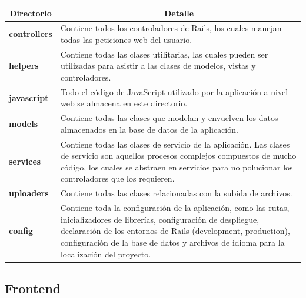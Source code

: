 \begin{center}
  \begin{tabular}{ | l | p{12.5cm} |}
    \hline
    \multicolumn{1}{|c|}{\textbf{Directorio}} & \multicolumn{1}{|c|}{\textbf{Detalle}} \\
    \hline
    
    {\textbf{controllers}} & Contiene todos los controladores de Rails, los cuales manejan todas las peticiones web del usuario. \\ \hline
    
    {\textbf{helpers}} & Contiene todas las clases utilitarias, las cuales pueden ser utilizadas para asistir a las clases de modelos, vistas y controladores. \\ \hline
    
    {\textbf{javascript}} & Todo el código de JavaScript utilizado por la aplicación a nivel web se almacena en este directorio.\\ \hline
    
    {\textbf{models}} & Contiene todas las clases que modelan y envuelven los datos almacenados en la base de datos de la aplicación. \\ \hline
    
    {\textbf{services}} & Contiene todas las clases de servicio de la aplicación. Las clases de servicio son aquellos procesos complejos compuestos de mucho código, los cuales se abstraen en servicios para no polucionar los controladores que los requieren. \\ \hline
    
    {\textbf{uploaders}} & Contiene todas las clases relacionadas con la subida de archivos. \\ \hline
    
    {\textbf{config}} & Contiene toda la configuración de la aplicación, como las rutas, inicializadores de librerías, configuración de despliegue, declaración de los entornos de Rails (development, production), configuración de la base de datos y archivos de idioma para la localización del proyecto.\\ \hline
  \end{tabular}
\end{center}

\subsection{Frontend}

